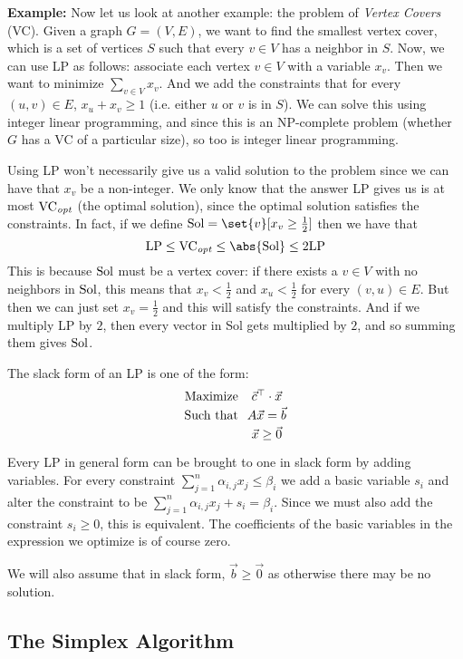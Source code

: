 {\bf Example:} Now let us look at another example: the problem of {\it Vertex Covers} (VC).
Given a graph $G=(V,E)$, we want to find the smallest vertex cover, which is a set of vertices $S$ such that every $v\in V$ has a neighbor in $S$.
Now, we can use LP as follows: associate each vertex $v\in V$ with a variable $x_v$.
Then we want to minimize $\sum_{v\in V}x_v$.
And we add the constraints that for every $(u,v)\in E$, $x_u+x_v\geq1$ (i.e. either $u$ or $v$ is in $S$).
We can solve this using integer linear programming, and since this is an NP-complete problem (whether $G$ has a VC of a particular size), so too is integer linear programming.

Using LP won't necessarily give us a valid solution to the problem since we can have that $x_v$ be a non-integer.
We only know that the answer LP gives us is at most ${\rm VC}_{\it opt}$ (the optimal solution), since the optimal solution satisfies the constraints.
In fact, if we define ${\rm Sol}=\set{v}[x_v\geq\frac12]$ then we have that
$$ {\rm LP} \leq {\rm VC}_{\it opt} \leq \abs{\rm Sol} \leq 2{\rm LP} $$
This is because ${\rm Sol}$ must be a vertex cover: if there exists a $v\in V$ with no neighbors in ${\rm Sol}$, this means that $x_v<\frac12$ and $x_u<\frac12$ for every $(v,u)\in E$.
But then we can just set $x_v=\frac12$ and this will satisfy the constraints.
And if we multiply LP by $2$, then every vector in Sol gets multiplied by $2$, and so summing them gives ${\rm Sol}$.
\qqed

\bdefn

    The {\emphcolor slack form} of an LP is one of the form:
    $$ \vbox{\tabskip=.25cm\openup1\jot\halign{\hfil#&\hfil#\hfil\cr
    Maximize&$\vec c^\top\cdot\vec x$\cr
    Such that&$A\vec x=\vec b$\cr
    &$\vec x\geq\vec 0$\cr}} $$

\edefn

Every LP in general form can be brought to one in slack form by adding variables.
For every constraint $\sum_{j=1}^n\alpha_{i,j}x_j\leq\beta_i$ we add a basic variable $s_i$ and alter the constraint to be $\sum_{j=1}^n\alpha_{i,j}x_j+s_i=\beta_i$.
Since we must also add the constraint $s_i\geq0$, this is equivalent.
The coefficients of the basic variables in the expression we optimize is of course zero.

We will also assume that in slack form, $\vec b\geq\vec 0$ as otherwise there may be no solution.

\subsection{The Simplex Algorithm}

